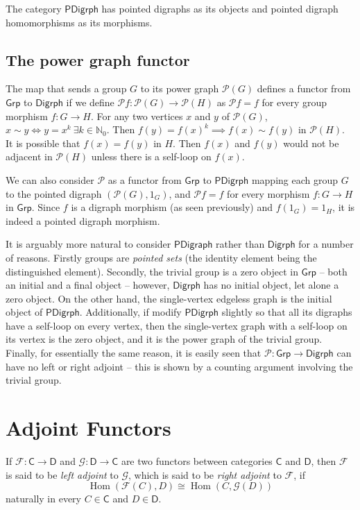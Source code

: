 \documentclass[11pt, a4paper]{article}
\newcommand{\cat}[1]{\mathsf{#1}}
\newcommand{\fun}[1]{\mathcal{#1}}
\DeclareMathOperator{\Hom}{Hom}
\theoremstyle{definition}
\begin{document}
The category $\cat{PDigrph}$ has pointed digraphs as its objects and pointed digraph homomorphisms as its morphisms.

\subsection{The power graph functor}
The map that sends a group $G$ to its power graph $\fun P(G)$ defines a functor from $\cat{Grp}$ to $\cat{Digrph}$ if we define $\fun Pf \colon \fun P(G) \to \fun P(H)$ as $\fun Pf = f$ for every group morphism $f \colon G \to H$. For any two vertices $x$ and $y$ of $\fun P(G)$, $x \sim y \iff y = x^k\ \exists k \in \mathbb N_0$. Then $f(y) = f(x)^k \implies f(x) \sim f(y)$ in $\fun P(H)$. It is possible that $f(x) = f(y)$ in $H$. Then $f(x)$ and $f(y)$ would not be adjacent in $\fun P(H)$ unless there is a self-loop on $f(x)$.

We can also consider $\fun P$ as a functor from $\cat{Grp}$ to $\cat{PDigrph}$ mapping each group $G$ to the pointed digraph $(\fun P(G), 1_G)$, and $\fun Pf = f$ for every morphism $f \colon G \to H$ in $\cat{Grp}$. Since $f$ is a digraph morphism (as seen previously) and $f(1_G) = 1_H$, it is indeed a pointed digraph morphism.

It is arguably more natural to consider $\cat{PDigraph}$ rather than $\cat{Digrph}$ for a number of reasons. Firstly groups are \emph{pointed sets} (the identity element being the distinguished element). Secondly, the trivial group is a zero object in $\cat{Grp}$ -- both an initial and a final object -- however, $\cat{Digrph}$ has no initial object, let alone a zero object. On the other hand, the single-vertex edgeless graph is the initial object of $\cat{PDigrph}$. Additionally, if modify $\cat{PDigrph}$ slightly so that all its digraphs have a self-loop on every vertex, then the single-vertex graph with a self-loop on its vertex is the zero object, and it is the power graph of the trivial group. Finally, for essentially the same reason, it is easily seen that $\fun P \colon \cat{Grp} \to \cat{Digrph}$ can have no left or right adjoint -- this is shown by a counting argument involving the trivial group.

\section{Adjoint Functors}\label{sec:AdjFun}
If $\fun F \colon \cat C \to \cat D$ and $\fun G \colon \cat D \to \cat C$ are two functors between categories $\cat C$ and $\cat D$, then $\fun F$ is said to be \emph{left adjoint} to $\fun G$, which is said to be \emph{right adjoint} to $\fun F$, if
\begin{equation*}
\Hom(\fun F(C), D) \cong \Hom(C, \fun G(D))
\end{equation*}
naturally in every $C \in \cat C$ and $D \in \cat D$.
\end{document}
